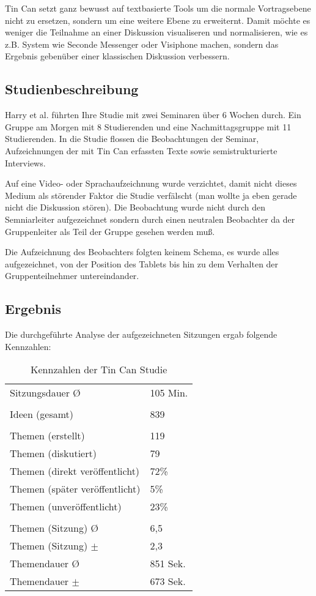 Tin Can setzt ganz bewusst auf textbasierte Tools um die normale Vortragsebene
nicht zu ersetzen, sondern um eine weitere Ebene zu erweiternt. Damit möchte es
weniger die Teilnahme an einer Diskussion visualiseren und normalisieren, wie es
z.B. System wie Seconde Messenger oder Visiphone machen, sondern das Ergebnis
gebenüber einer klassischen Diskussion verbessern.

\subsection{Studienbeschreibung}
Harry et al. führten Ihre Studie mit zwei Seminaren über 6 Wochen durch. Ein
Gruppe am Morgen mit 8 Studierenden und eine Nachmittagsgruppe mit 11
Studierenden. In die Studie flossen die Beobachtungen der Seminar,
Aufzeichnungen der mit Tin Can erfassten Texte sowie semistrukturierte
Interviews.

Auf eine Video- oder Sprachaufzeichnung wurde verzichtet, damit nicht dieses
Medium als störender Faktor die Studie verfälscht (man wollte ja eben gerade
nicht die Diskussion stören). Die Beobachtung wurde nicht durch den
Semniarleiter aufgezeichnet sondern durch einen neutralen Beobachter da der
Gruppenleiter als Teil der Gruppe gesehen werden muß.

Die Aufzeichnung des Beobachters folgten keinem Schema, es wurde alles
aufgezeichnet, von der Position des Tablets bis hin zu dem Verhalten der
Gruppenteilnehmer untereindander.


\subsection{Ergebnis}
Die durchgeführte Analyse der aufgezeichneten Sitzungen ergab folgende Kennzahlen:

\begin{table}[htp]
  \begin{tabular}{ l  l }
    Sitzungsdauer \O & 105 Min.\\
    \\
    Ideen  (gesamt) &  839 \\
    \\
    Themen (erstellt) & 119 \\
    Themen (diskutiert) & 79 \\
    Themen (direkt veröffentlicht) & 72\% \\
    Themen (später veröffentlicht) & 5\% \\ 
    Themen (unveröffentlicht) & 23\% \\
    \\
    Themen (Sitzung) \O & 6,5 \\
    Themen (Sitzung) $\pm$ & 2,3 \\
    Themendauer \O & 851 Sek. \\
    Themendauer $\pm$ & 673 Sek. \\
  \end{tabular}
  \caption{Kennzahlen der Tin Can Studie}
\end{table}

